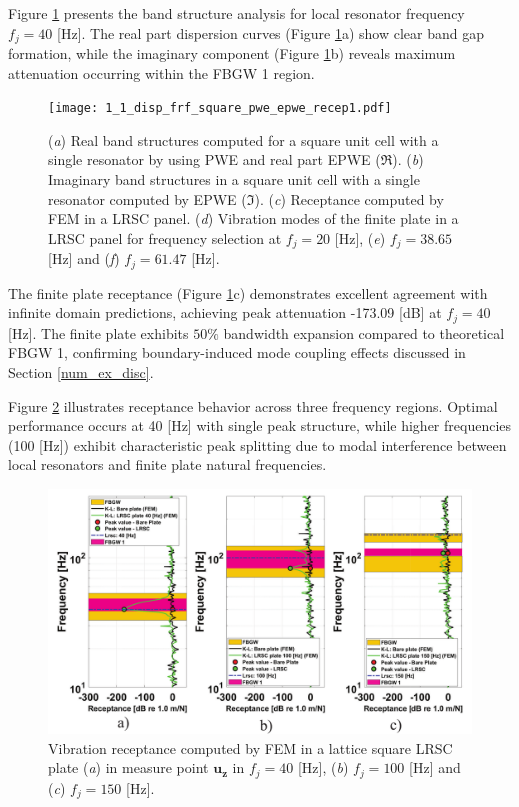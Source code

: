 \documentclass[review,numbers,sort&compress]{elsarticle}
\begin{document}
{Figure \ref{lat_s_pwe_epwe_tr_frf} presents the band structure analysis for local resonator frequency $f_j = 40$ [Hz]. The real part dispersion curves (Figure \ref{lat_s_pwe_epwe_tr_frf}a) show clear band gap formation, while the imaginary component (Figure \ref{lat_s_pwe_epwe_tr_frf}b) reveals maximum attenuation occurring within the FBGW 1 region.
\newpage
\begin{figure}[htb]
	\centering
	\texttt{[image: 1\_1\_disp\_frf\_square\_pwe\_epwe\_recep1.pdf]}
	\caption{(\textit{a}) Real band structures computed for a square unit cell with a single resonator by using PWE and real part EPWE ($\Re$). (\textit{b}) Imaginary band structures in a square unit cell with a single resonator computed by EPWE ($\Im$). (\textit{c}) Receptance computed by FEM in a LRSC panel. (\textit{d}) Vibration modes of the finite plate in a LRSC panel for frequency selection at $f_j = 20$ [Hz], (\textit{e}) $f_j = 38.65$ [Hz] and (\textit{f}) $f_j = 61.47$ [Hz].}
	\label{lat_s_pwe_epwe_tr_frf}
\end{figure}

The finite plate receptance (Figure \ref{lat_s_pwe_epwe_tr_frf}c) demonstrates excellent agreement with infinite domain predictions, achieving peak attenuation -173.09 [dB] at $f_j = 40$ [Hz]. The finite plate exhibits $50\%$ bandwidth expansion compared to theoretical FBGW 1, confirming boundary-induced mode coupling effects discussed in Section \ref{num_ex_disc}.

Figure \ref{lat_s_tr_frf_f1_f2_f3} illustrates receptance behavior across three frequency regions. Optimal performance occurs at 40 [Hz] with single peak structure, while higher frequencies (100 [Hz]) exhibit characteristic peak splitting due to modal interference between local resonators and finite plate natural frequencies.
\newpage
\begin{figure}[htb]
	\centering
	\includegraphics[width=1.0\textwidth]{2_1_disp_frf_square_3_receps.pdf}
	\caption{Vibration receptance computed by FEM in a lattice square LRSC plate (\textit{a}) in measure point  $\mathbf{u_z}$ in $f_j = 40$ [Hz], (\textit{b}) $f_j = 100$ [Hz] and (\textit{c}) $f_j = 150$ [Hz].}
	\label{lat_s_tr_frf_f1_f2_f3}
\end{figure}

}
\end{document}
